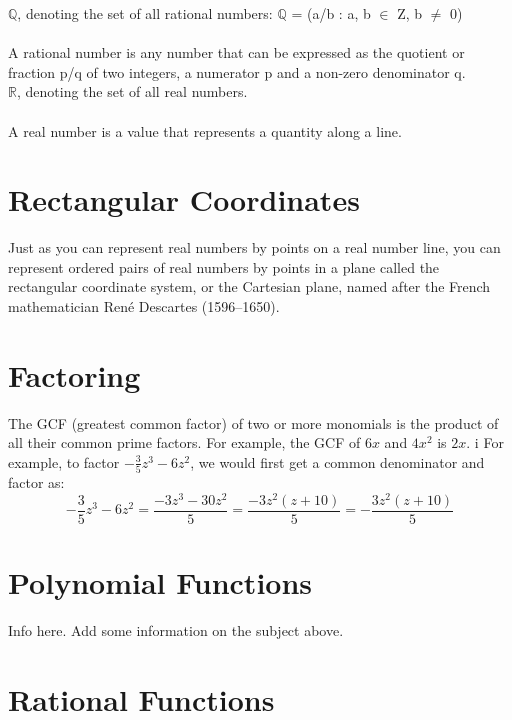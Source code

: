 \documentclass[12pt, letterpaper]{article}
\begin{document}
\noindent$\mathbb{Q}$, denoting the set of all rational numbers:
$\mathbb{Q}$ = (a/b : a, b $\in$ Z, b $\neq$ 0)
\\\\
A rational number is any number that can be expressed as the quotient or
fraction p/q of two integers, a numerator p and a non-zero denominator q.
\\

\noindent$\mathbb{R}$, denoting the set of all real numbers.
\\\\
A real number is a value that represents a quantity along a line.
\\

\section{Rectangular Coordinates}

Just as you can represent real numbers by points on a real number line, you can
represent ordered pairs of real numbers by points in a plane called the
rectangular coordinate system, or the Cartesian plane, named after the French
mathematician René Descartes (1596–1650).
\\

\section{Factoring}

The GCF (greatest common factor) of two or more monomials is the product of all 
their common prime factors. For example, the GCF of $6x$ and $4x^2$ is $2x$.
i
For example, to factor $-\frac{3}{5}z^3 - 6z^2$, we would first get a common
denominator and factor as: 
\[ -\frac{3}{5}z^3 - 6z^2 = \frac{-3z^3 - 30z^2}{5} =
\frac{-3z^2(z + 10)}{5} = -\frac{3z^2(z + 10)}{5}\]

\section{Polynomial Functions}

Info here. Add some information on the subject above. 

\section{Rational Functions}
\end{document}
